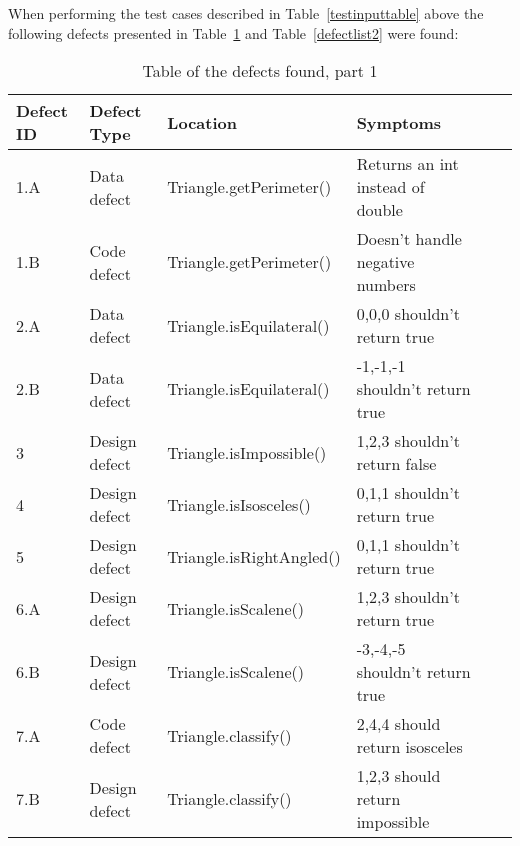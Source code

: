 When performing the test cases described in Table~\ref{testinputtable} above the following defects presented in Table~\ref{defectlist1} and Table~\ref{defectlist2} were found:

\begin{table}[!htb]
\centering
\caption{Table of the defects found, part 1}
\label{defectlist1}
\begin{tabular}{|l|l|l|l|l|l|}
\hline  Defect ID & Defect Type   & Location  & Symptoms\\ \hline
1.A       & Data defect   & Triangle.getPerimeter()  & Returns an int instead of double \\
1.B       & Code defect   & Triangle.getPerimeter()  & Doesn't handle negative numbers  \\
2.A       & Data defect   & Triangle.isEquilateral() & 0,0,0 shouldn't return true      \\
2.B       & Data defect   & Triangle.isEquilateral() & -1,-1,-1 shouldn't return true   \\
3         & Design defect & Triangle.isImpossible()  & 1,2,3 shouldn't return false     \\
4         & Design defect & Triangle.isIsosceles()   & 0,1,1 shouldn't return true      \\
5         & Design defect & Triangle.isRightAngled() & 0,1,1 shouldn't return true      \\
6.A       & Design defect & Triangle.isScalene()     & 1,2,3 shouldn't return true      \\
6.B       & Design defect & Triangle.isScalene()     & -3,-4,-5 shouldn't return true   \\
7.A       & Code defect   & Triangle.classify()      & 2,4,4 should return isosceles    \\
7.B       & Design defect & Triangle.classify()      & 1,2,3 should return impossible   \\         \hline     
\end{tabular}
\end{table}

\newpage

